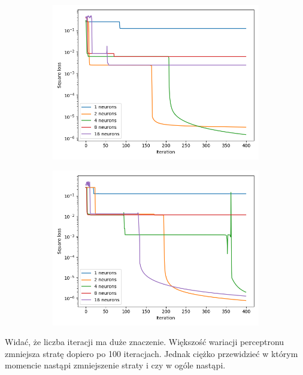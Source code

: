 \documentclass[12pt,a4paper]{article}
\begin{document}
\begin{figure}[h]
\medskip
\begin{subfigure}{0.5\textwidth}
  \includegraphics[width=\linewidth]{charts/double_activation/doubleactiv_400iter.png}
  \caption{}
  \label{}
\end{subfigure}\hfil
\begin{subfigure}{0.5\textwidth}
  \includegraphics[width=\linewidth]{charts/double_activation/doubleactiv_400iter2.png}
  \caption{}
  \label{}
\end{subfigure}

\end{figure}

Widać, że liczba iteracji ma duże znaczenie. Większość wariacji perceptronu zmniejsza stratę dopiero po 100 iteracjach. Jednak ciężko przewidzieć w którym momencie nastąpi zmniejszenie straty i czy w ogóle nastąpi.
\end{document}
